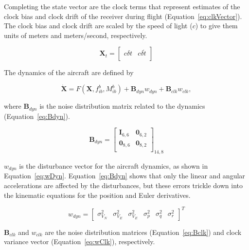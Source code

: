 Completing the state vector are the clock terms that represent estimates of the clock bias and clock drift of the receiver during flight (Equation~\ref{eq:clkVector}). The clock bias and clock drift are scaled by the speed of light (\(c\)) to give them units of meters and meters/second, respectively.

\begin{equation}\label{eq:clkVector}
    \mathbf{X}_t = \begin{bmatrix}
        c\delta t & c\delta\dot{t} \\
    \end{bmatrix}
\end{equation}

The dynamics of the aircraft are defined by

\begin{equation}\label{eq:eulerIntegration}
    \dot{\mathbf{X}} = F\left(\mathbf{X},f_{ib}^b,M_{ib}^b\right) + \mathbf{B}_{dyn}w_{dyn} + \mathbf{B}_{clk}w_{clk},
\end{equation}

where \(\mathbf{B}_{dyn}\) is the noise distribution matrix related to the dynamics (Equation~\ref{eq:Bdyn}).

\begin{equation}\label{eq:Bdyn}
    \mathbf{B}_{dyn} =\begin{bmatrix}
        \mathbf{I}_{6,6} & \mathbf{0}_{6,2} \\
        \mathbf{0}_{8,6} & \mathbf{0}_{8,2} \\
    \end{bmatrix}_{14,8}
\end{equation}

\(w_{dyn}\) is the disturbance vector for the aircraft dynamics, as shown in Equation~\ref{eq:wDyn}. Equation~\ref{eq:Bdyn} shows that only the linear and angular accelerations are affected by the disturbances, but these errors trickle down into the kinematic equations for the position and Euler derivatives.

\begin{equation}\label{eq:wDyn}
    w_{dyn} = \begin{bmatrix}
        \sigma^2_{V_N} & \sigma^2_{V_E} & \sigma^2_{V_E} & \sigma^2_{p} & \sigma^2_{q} & \sigma^2_{r}
    \end{bmatrix}^T
\end{equation}

\(\mathbf{B}_{clk}\) and \(w_{clk}\) are the noise distribution matrices (Equation~\ref{eq:Bclk}) and clock variance vector (Equation~\ref{eq:wClk}), respectively.

